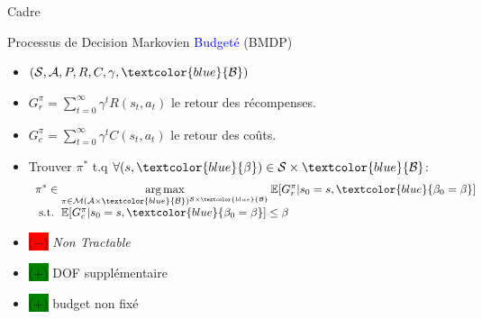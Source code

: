 \documentclass[french]{beamer}
\newcommand{\cplus}{\colorbox{green}{($+$)} }
\newcommand{\cmoins}{\colorbox{red}{($-$)} }
\begin{document}
    \begin{frame}{Cadre}

        \begin{block}{Processus de Decision Markovien \textcolor{blue}{Budgeté} (BMDP)}
            \begin{itemize}
                \item $(\cS, \cA, P, R,{C}, \gamma,\textcolor{blue}{\cB})$
                \item $G_r^\pi = \sum_{t=0}^\infty \gamma^t R(s_t, a_t)$ le retour des récompenses.
                \item  $G_c^\pi = \sum_{t=0}^\infty \gamma^t C(s_t, a_t)$ le retour des coûts.
                \item Trouver $\pi^*$ t.q $\forall (s,\textcolor{blue}{\beta})\in\cS\times\textcolor{blue}{\cB}$:
                \begin{equation}
                    \label{eq:bmdp}
                    \begin{array}{lcr}
                        \displaystyle \pi^* \in \argmax_{\pi\in\cM(\cA\times\textcolor{blue}{\cB})^{\cS\times\textcolor{blue}{\cB}}} \expectedvalue[G_r^\pi | s_0=s,\textcolor{blue}{\beta_0=\beta}] \\
                        \text{ s.t. }  \expectedvalue[G_c^\pi | s_0=s,\textcolor{blue}{\beta_0=\beta}] \leq \beta
                    \end{array}
                \end{equation}
            \end{itemize}
        \end{block}


        \begin{block}{}
            \begin{itemize}
                \item \cmoins \textit{Non Tractable}
                \item \cplus DOF supplémentaire
                \item \cplus budget non fixé

            \end{itemize}
        \end{block}

    \end{frame}
\end{document}
